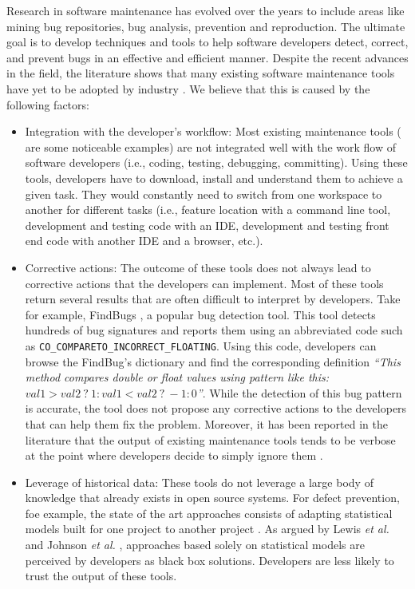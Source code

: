 Research in software maintenance has evolved over the years to include areas like mining bug repositories, bug analysis, prevention and reproduction. The ultimate goal is to develop techniques and tools to help software developers detect, correct, and prevent bugs in an effective and efficient manner. Despite the recent advances in the field, the literature shows that many existing software maintenance tools have yet to be adopted by industry \cite{Lewis2013,Foss2015,Layman2007,Ayewah2007,Ayewah2008,Johnson2013,Norman2013, Hovemeyer2004, Lopez2011}. We believe that this is caused by the following factors:
\begin{itemize}
	\item Integration with the developer's workflow: Most existing maintenance tools (\cite{Kim2006a,Ayewah2008b, Findbugs2015,Moha2010,Palma,Nayrolles2013d,Nayrolles,Nayrolles2013a, Nayrolles2015a} are some noticeable examples) are not integrated well with the work flow of software developers (i.e., coding, testing, debugging, committing). Using these tools, developers have to download, install and understand them to achieve a given task. They would constantly need to switch from one workspace to another for different tasks (i.e., feature location with a command line tool, development and testing  code with an IDE, development and testing front end code with another IDE and a browser, etc.)\cite{Robertson2004,Robertson2006,Beckwith2006}.

	\item Corrective actions: The outcome of these tools does not always lead to corrective actions that the developers can implement. Most of these tools return several results that are often difficult to interpret by developers. Take for example, FindBugs \cite{Hovemeyer2004}, a popular bug detection tool. This tool detects hundreds of bug signatures and reports them using an abbreviated code such as {\tt CO\_COMPARETO\_INCORRECT\_FLOATING}. Using this code, developers can browse the FindBug's dictionary and find the corresponding definition {\it ``This method compares double or float values using pattern like this: $val1 > val2~?~1 : val1 < val2~?~-1 : 0$''}. While the detection of this bug pattern is accurate, the tool does not propose any corrective actions to the developers that can help them fix the problem. Moreover, it has been reported in the literature that the output of existing maintenance tools tends to be verbose at the point where developers decide to simply ignore them \cite{Arai2014, Kim2007b, Kim2007c, Ayewah2010, Shen2011}.

	\item Leverage of historical data: These tools do not leverage a large body of knowledge that already exists in open source systems.  For defect prevention, foe example, the state of the art approaches consists of adapting statistical models built for one project to another project \cite{Lo2013, Nam2013}.	As argued by Lewis {\it et al.} \cite{Lewis2013} and Johnson {\it et al.} \cite{Johnson2013}, approaches based solely on statistical models are perceived by developers as black box solutions. Developers are less likely to trust the output of these tools.
\end{itemize}

